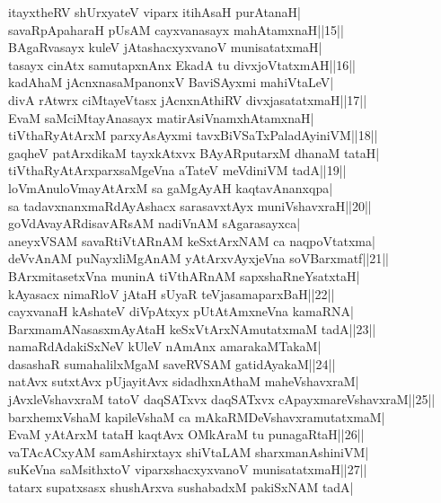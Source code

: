 \documentclass{article}
\begin{document}
itayxtheRV shUrxyateV viparx itihAsaH purAtanaH|\\
savaRpApaharaH pUsAM cayxvanasayx mahAtamxnaH||15||\\
BAgaRvasayx kuleV jAtashacxyxvanoV munisatatxmaH|\\
tasayx cinAtx samutapxnAnx EkadA tu divxjoVtatxmAH||16||\\
kadAhaM jAcnxnasaMpanonxV BaviSAyxmi mahiVtaLeV|\\
divA rAtwrx ciMtayeVtasx jAcnxnAthiRV divxjasatatxmaH||17||\\
EvaM saMciMtayAnasayx matirAsiVnamxhAtamxnaH|\\
tiVthaRyAtArxM parxyAsAyxmi tavxBiVSaTxPaladAyiniVM||18||\\
gaqheV patArxdikaM tayxkAtxvx BAyARputarxM dhanaM tataH|\\
tiVthaRyAtArxparxsaMgeVna aTateV meVdiniVM tadA||19||\\
loVmAnuloVmayAtArxM sa gaMgAyAH kaqtavAnanxqpa|\\
sa tadavxnanxmaRdAyAshacx sarasavxtAyx muniVshavxraH||20||\\
goVdAvayARdisavARsAM nadiVnAM sAgarasayxca|\\
aneyxVSAM savaRtiVtARnAM keSxtArxNAM ca naqpoVtatxma|\\
deVvAnAM puNayxliMgAnAM yAtArxvAyxjeVna soVBarxmatf||21||\\
BArxmitasetxVna muninA tiVthARnAM sapxshaRneYsatxtaH|\\
kAyasacx nimaRloV jAtaH sUyaR teVjasamaparxBaH||22||\\
cayxvanaH kAshateV diVpAtxyx pUtAtAmxneVna kamaRNA|\\
BarxmamANasasxmAyAtaH keSxVtArxNAmutatxmaM tadA||23||\\
namaRdAdakiSxNeV kUleV nAmAnx amarakaMTakaM|\\
dasashaR sumahalilxMgaM saveRVSAM gatidAyakaM||24||\\
natAvx sutxtAvx pUjayitAvx sidadhxnAthaM maheVshavxraM|\\
jAvxleVshavxraM tatoV daqSATxvx daqSATxvx cApayxmareVshavxraM||25||\\
barxhemxVshaM kapileVshaM ca mAkaRMDeVshavxramutatxmaM|\\
EvaM yAtArxM tataH kaqtAvx OMkAraM tu punagaRtaH||26||\\
vaTAcACxyAM samAshirxtayx shiVtaLAM sharxmanAshiniVM|\\
suKeVna saMsithxtoV viparxshacxyxvanoV munisatatxmaH||27||\\
tatarx supatxsasx shushArxva sushabadxM pakiSxNAM tadA|\\
\end{document}
